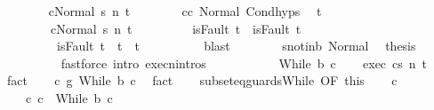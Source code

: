 \begin{isabellebody}
\ \ \ \ \ \ \isamarkupfalse%
\ {\isachardoublequoteopen}{\isasymGamma}{\isasymturnstile}{\isasymlangle}c{}{\isacharcomma}Normal\ s{\isacharprime}{\isasymrangle}\ {\isacharequal}n{\isasymRightarrow}\ t{\isachardoublequoteclose}\isanewline
\ \ \ \ \ \ \isamarkupfalse%
\ c{}{\isacharunderscore}c{}{\isacharprime}\ Normal\ Cond{\isachardot}hyps\ \isamarkupfalse%
\ t{\isacharprime}\ \isanewline
\ \ \ \ \ \ \ \ {\isachardoublequoteopen}{\isasymGamma}{\isasymturnstile}{\isasymlangle}c{}{\isacharprime}{\isacharcomma}Normal\ s{\isacharprime}{\isasymrangle}\ {\isacharequal}n{\isasymRightarrow}\ t{\isacharprime}{\isachardoublequoteclose}\ \isanewline
\ \ \ \ \ \ \ \ {\isachardoublequoteopen}isFault\ t\ {\isasymlongrightarrow}\ isFault\ t{\isacharprime}{\isachardoublequoteclose}\ \isanewline
\ \ \ \ \ \ \ \ {\isachardoublequoteopen}{\isasymnot}\ isFault\ t{\isacharprime}\ {\isasymlongrightarrow}\ t{\isacharprime}\ {\isacharequal}\ t{\isachardoublequoteclose}\isanewline
\ \ \ \ \ \ \ \ \isamarkupfalse%
\ blast\isanewline
\ \ \ \ \ \ \isamarkupfalse%
\ s{\isacharprime}{\isacharunderscore}notin{\isacharunderscore}b\ Normal\ \isamarkupfalse%
\ {\isacharquery}thesis\isanewline
\ \ \ \ \ \ \ \ \isamarkupfalse%
\ {\isacharparenleft}fastforce\ intro{\isacharcolon}\ execn{\isachardot}intros{\isacharparenright}\isanewline
\ \ \ \ \isamarkupfalse%
\isanewline
\ \ \isamarkupfalse%
\isanewline
{}\isamarkupfalse%
\isanewline
\ \ \isamarkupfalse%
\ {\isacharparenleft}While\ b\ c{\isacharprime}{\isacharparenright}\isanewline
\ \ \isamarkupfalse%
\ exec{\isacharcolon}\ {\isachardoublequoteopen}{\isasymGamma}{\isasymturnstile}{\isasymlangle}c{\isacharcomma}s{\isasymrangle}\ {\isacharequal}n{\isasymRightarrow}\ t{\isachardoublequoteclose}\ \isamarkupfalse%
\ fact\isanewline
\ \ \isamarkupfalse%
\ {\isachardoublequoteopen}c\ {\isasymsubseteq}\isactrlsub g\ While\ b\ c{\isacharprime}{\isachardoublequoteclose}\ \isamarkupfalse%
\ fact\isanewline
\ \ \isamarkupfalse%
\ subseteq{\isacharunderscore}guards{\isacharunderscore}While\ {\isacharbrackleft}OF\ this{\isacharbrackright}\isanewline
\ \ \isamarkupfalse%
\ c{\isacharprime}{\isacharprime}\ \ \isanewline
\ \ \ \ c{\isacharcolon}\ {\isachardoublequoteopen}c\ {\isacharequal}\ While\ b\ c{\isacharprime}{\isacharprime}{\isachardoublequoteclose}\ \isanewline

\end{isabellebody}
